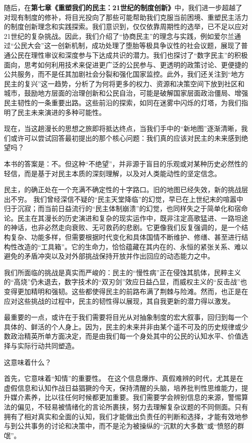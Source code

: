 \documentclass[UTF8, 10pt]{ctexbook}
\begin{document}
随后，在\textbf{第七章《重塑我们的民主：21世纪的制度创新》}中，我们进一步超越了对现有制度的修补，将目光投向了那些可能帮助我们克服当前困境、重塑民主活力的制度创新理念和实践探索。我们意识到，仅仅依靠周期性的选举，已不足以应对21世纪的复杂挑战。因此，我们介绍了“协商民主”的理念与实践，例如爱尔兰通过“公民大会”这一创新机制，成功处理了堕胎等极具争议性的社会议题，展现了普通公民在理性审议和深度参与下达成共识的潜力。我们也探讨了“数字民主”的积极面向，思考如何利用技术来促进更广泛的公民参与、更透明的政策讨论、更便捷的公共服务，而不是任其加剧社会分裂和强化国家监控。此外，我们还关注到“地方民主的复兴”这一趋势，分析了为何将更多的权力、资源和决策空间下放到社区和城市，鼓励地方层面的治理创新和公民自治，可能是破解国家层面政治僵局、增强民主韧性的一条重要出路。这些前沿的探索，如同在迷雾中闪烁的灯塔，为我们指明了民主未来演进的多种可能性。

现在，当这趟漫长的思想之旅即将抵达终点，当我们手中的“新地图”逐渐清晰，我们或许可以尝试回答最初提出的那个核心问题：我们真的应该对民主的未来感到绝望吗？

本书的答案是：不。但这种“不绝望”，并非源于盲目的乐观或对某种历史必然性的轻信，而是基于对民主本质的深刻理解，以及对人类能动性的坚定信念。

民主，的确正处在一个充满不确定性的十字路口。旧的地图已经失效，新的挑战层出不穷。 我们曾经深信不疑的“民主天堂降临”的幻觉，早已在上世纪末的喧嚣中归于沉寂；而当前日益流行的“民主体制崩溃”的幻觉，也同样失之于简单化和宿命论。民主在其漫长的历史演进和复杂的现实运作中，既非注定高歌猛进、一路坦途的神话，也非必然走向衰败、无可救药的悲剧。它更像我们反复强调的，是一个结构复杂、功能多样，但需要根据时代变化和具体国情不断维护、修缮、甚至进行结构性改造的“工具箱”。它的生命力，恰恰蕴藏在其内在的、永恒的紧张关系、难以避免的矛盾冲突以及对外部挑战保持开放并作出回应的动态能力之中。

我们所面临的挑战是真实而严峻的：民主的“慢性病”正在侵蚀其肌体，民粹主义的“高烧”仍未退去，数字技术的“双刃剑”效应日益凸显，而威权主义的“反击战”也变得更加精明和强韧。这些都使得民主的前路布满了荆棘与险滩。然而，也正是在应对这些挑战的过程中，民主的韧性得以展现，其自我更新的潜力得以激发。

最重要的一点，或许在于我们需要将目光从对抽象制度的宏大叙事，回归到每一个具体的、鲜活的个人身上。因为，民主的未来并非由某个遥不可及的历史规律或少数政治精英所单方面决定，而是由我们每一个身处其中的公民的认知水平、价值选择与实际行动共同塑造。

这意味着什么？

首先，它意味着“知情”的重要性。 在这个信息爆炸、真假难辨的时代，尤其是在虚假信息和认知作战日益猖獗的今天，保持清醒的头脑，培养批判性思维能力，提升媒介素养，比以往任何时候都更加重要。我们需要学会辨别信息的来源，警惕算法的偏见，不轻易被情绪化的言论所裹挟，努力去理解复杂议题的不同侧面。只有拥有了相对真实和全面的认知，我们才能做出负责任的判断和选择，才能有效地参与到公共事务的讨论和决策中，而不是沦为被操纵的“沉默的大多数”或“愤怒的群氓”。
\end{document}
